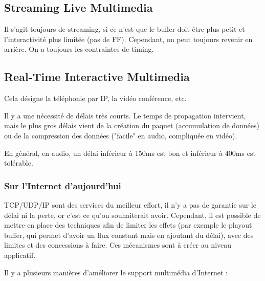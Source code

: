 \documentclass[10pt,a4paper]{report}
\begin{document}
		\subsection{Streaming Live Multimedia}

		Il s'agit toujours de streaming, si ce n'est que le buffer doit être plus petit et l'interactivité plus limitée (pas de FF). Cependant, on peut toujours revenir en arrière. On a toujours les contraintes de timing.
		
		\subsection{Real-Time Interactive Multimedia}
		
		Cela désigne la téléphonie par IP, la vidéo conférence, etc.
		
		Il y a une nécessité de délais très courts. Le temps de propagation intervient, mais le plus gros délais vient de la création du paquet (accumulation de données) ou de la compression des données ("facile" en audio, compliquée en vidéo).
		
		En général, en audio, un délai inférieur à 150ms est bon et inférieur à 400ms est tolérable.
		
			\subsubsection{Sur l'Internet d'aujourd'hui}
		
			TCP/UDP/IP sont des services du meilleur effort, il n'y a pas de garantie sur le délai ni la perte, or c'est ce qu'on souhaiterait avoir. Cependant, il est possible de mettre en place des techniques afin de limiter les effets (par exemple le playout buffer, qui permet d'avoir un flux constant mais en ajoutant du délai), avec des limites et des concessions à faire. Ces mécanismes sont à créer au niveau applicatif.
		
			Il y a plusieurs manières d'améliorer le support multimédia d'Internet :
		
\end{document}
